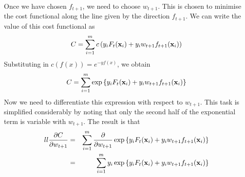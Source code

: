 Once we have chosen $f_{t+1}$, we need to choose $w_{t+1}$.  This is
chosen to minimise the cost functional along the line given by the
direction $f_{t+1}$.  We can write the value of this cost functional
as
%
\begin{equation}
C = \sum_{i=1}^{m} c \left( y_i F_t(\mathbf{x}_i) + y_i w_{t+1}
f_{t+1}(\mathbf{x}_i) \right)
\end{equation}
Substituting in $c(f(x)) = e^{-yf(x)}$, we obtain
%
\begin{equation}
C = \sum_{i=1}^{m} \exp \left\{ y_i F_t(\mathbf{x}_i) + y_i w_{t+1}
f_{t+1}(\mathbf{x}_i) \right\}
\end{equation}
%
Now we need to differentiate this expression with respect to
$w_{t+1}$.   This task is simplified considerably by noting that only
the second half of the exponential term is variable with $w_{t+1}$.
The result is that
%
\begin{eqnarray}{ll}
\frac{\partial C}{\partial w_{t+1}} &
= & \sum_{i=1}^{m} \frac{\partial}{\partial w_{t+1}}
\exp \left\{ y_i F_t(\mathbf{x}_i) + y_i w_{t+1}
f_{t+1}(\mathbf{x}_i) \right\} \nonumber \\
& = & \sum_{i=1}^{m} y_i \exp \left\{ y_i F_t(\mathbf{x}_i) + y_i w_{t+1}
f_{t+1}(\mathbf{x}_i) \right\} 
\end{eqnarray}



